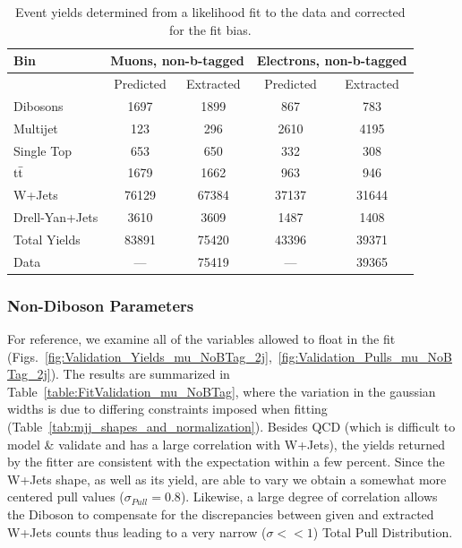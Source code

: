 \begin{table}[tbht!]
\begin{center}
\caption{Event yields determined from a likelihood fit to the data and corrected for the fit bias.}
 \label{table:BiasCorrectedFitTotalsAndComparisons}
\vspace{0.5cm}
 \begin{tabular} {l  c  c c c }
   \hline \hline
Bin            &  \multicolumn{2}{c}{Muons, non-b-tagged} & \multicolumn{2}{c}{Electrons, non-b-tagged} \\  
\hline
               & Predicted &   Extracted     &  Predicted &  Extracted \\
\hline
Dibosons       &   1697    &   1899          &    867     &  783 \\
Multijet       &    123    &   296           &   2610     &  4195  \\
Single Top     &    653    &   650           &    332     &  308 \\
$\mathrm{t}\bar{\mathrm{t}}$       &   1679    &   1662          &    963     &  946  \\
W+Jets         &  76129    &   67384         &  37137     &  31644 \\
Drell-Yan+Jets &   3610    &   3609          &   1487     &  1408 \\
Total Yields   &  83891    &   75420         &  43396     &  39371 \\ 
\hline 
Data           &    ---    &   75419         &    ---     &  39365 \\ 
\hline \hline
\end{tabular}
\end{center}
\end{table}

\subsubsection{Non-Diboson Parameters}
For reference, we examine all of the variables allowed to float in the fit (Figs.~\ref{fig:Validation_Yields_mu_NoBTag_2j},~\ref{fig:Validation_Pulls_mu_NoBTag_2j}). 
The results are summarized in Table~\ref{table:FitValidation_mu_NoBTag}, where
the variation in the gaussian widths is due to differing
constraints imposed when fitting
(Table~\ref{tab:mjj_shapes_and_normalization}). Besides QCD (which is difficult 
to model \& validate and has a large correlation with W+Jets), 
the yields returned by the fitter are consistent with the
expectation within a few percent. Since the W+Jets shape, as well as its yield, 
are able to vary we obtain a somewhat more centered pull values 
($\sigma_{Pull}=0.8$). Likewise, a large degree of correlation allows the Diboson
to compensate for the discrepancies between given and extracted W+Jets counts thus
leading to a very narrow ($\sigma<<1$) Total Pull Distribution.

